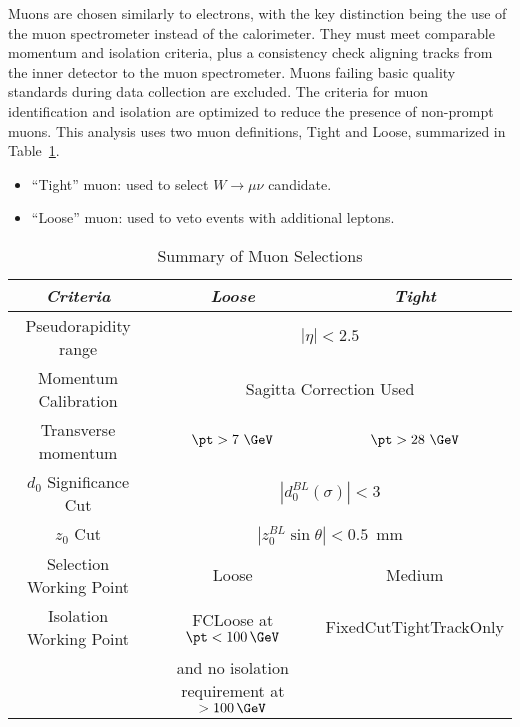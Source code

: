 \label{subsec:muon_selection}
Muons are chosen similarly to electrons, with the key distinction being the use of the muon spectrometer instead of the calorimeter. They must meet comparable momentum and isolation criteria, plus a consistency check aligning tracks from the inner detector to the muon spectrometer. Muons failing basic quality standards during data collection are excluded.
The criteria for muon identification and isolation are optimized to reduce the presence of non-prompt muons.
This analysis uses two muon definitions, Tight and Loose, summarized in Table~\ref{tab:muon_selection}.
\begin{itemize}
\item ``Tight'' muon: used to select $W\to \mu\nu$ candidate.
\item ``Loose'' muon: used to veto events with additional leptons.
\end{itemize}

\begin{table}[ht]
\caption{Summary of Muon Selections}
\label{tab:muon_selection}
\begin{center}
\begin{tabular}[ht]{|c|c|c|}
\hline
  \emph{Criteria} & \emph{Loose} & \emph{Tight}\\
\hline
  Pseudorapidity range & \multicolumn{2}{c|}{$|\eta|<2.5$} \\
\hline
  Momentum Calibration & \multicolumn{2}{c|}{Sagitta Correction Used} \\
\hline
  Transverse momentum & $\pt > 7~\GeV$ & $\pt > 28~\GeV$ \\
\hline
  $d_0$ Significance Cut & \multicolumn{2}{c|}{$|d_{0}^{BL}(\sigma)|<3$} \\
\hline
  $z_0$ Cut & \multicolumn{2}{c|}{$|z_{0}^{BL} \sin\theta| < 0.5$~mm} \\
\hline
  Selection Working Point & Loose & Medium\\
\hline
  Isolation Working Point & FCLoose at $\pt<100\,\GeV$                   & FixedCutTightTrackOnly \\
                          & and no isolation requirement at $>100\,\GeV$ & \\
\hline
\end{tabular}
\end{center}
\end{table}

